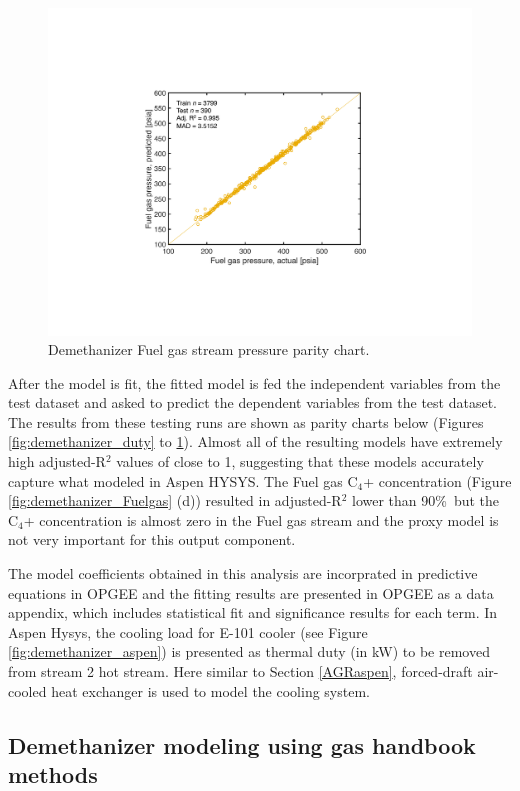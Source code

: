 \documentclass[11pt]{report}
\begin{document}
\begin{figure}
\includegraphics[width=0.85\columnwidth]{images/demethanizer_Fuelgasp.pdf}
\caption{Demethanizer Fuel gas stream pressure parity chart.}
\label{fig:demethanizer_Fuelgasp}
\end{figure}


After the model is fit, the fitted model is fed the independent variables from the test dataset and asked to predict the dependent variables from the test dataset. The results from these testing runs are shown as parity charts below (Figures \ref{fig:demethanizer_duty} to \ref{fig:demethanizer_Fuelgasp}). Almost all of the resulting models have extremely high adjusted-R$^2$ values of close to 1, suggesting that these models accurately capture what modeled in Aspen HYSYS. The Fuel gas C$_4$+ concentration (Figure \ref{fig:demethanizer_Fuelgas} (d)) resulted in adjusted-R$^2$ lower than 90\%\, but the C$_4$+ concentration is almost zero in the Fuel gas stream and the proxy model is not very important for this output component. 

The model coefficients obtained in this analysis are incorprated in predictive equations in OPGEE and the fitting results are presented in OPGEE as a data appendix, which includes statistical fit and significance results for each term. In Aspen Hysys, the cooling load for E-101 cooler (see Figure \ref{fig:demethanizer_aspen}) is presented as thermal duty (in kW) to be removed from stream 2 hot stream. Here similar to Section \ref{AGRaspen}, forced-draft air-cooled heat exchanger is used to model the cooling system.   

\subsection{Demethanizer modeling using gas handbook methods}
\end{document}
